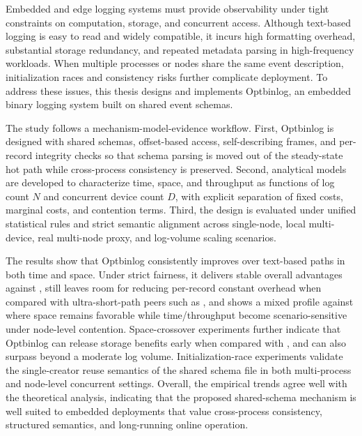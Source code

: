Embedded and edge logging systems must provide observability under tight constraints on computation, storage, and concurrent access. Although text-based logging is easy to read and widely compatible, it incurs high formatting overhead, substantial storage redundancy, and repeated metadata parsing in high-frequency workloads. When multiple processes or nodes share the same event description, initialization races and consistency risks further complicate deployment. To address these issues, this thesis designs and implements Optbinlog, an embedded binary logging system built on shared event schemas.

The study follows a mechanism-model-evidence workflow. First, Optbinlog is designed with shared schemas, offset-based access, self-describing frames, and per-record integrity checks so that schema parsing is moved out of the steady-state hot path while cross-process consistency is preserved. Second, analytical models are developed to characterize time, space, and throughput as functions of log count \(N\) and concurrent device count \(D\), with explicit separation of fixed costs, marginal costs, and contention terms. Third, the design is evaluated under unified statistical rules and strict semantic alignment across single-node, local multi-device, real multi-node proxy, and log-volume scaling scenarios.

The results show that Optbinlog consistently improves over text-based paths in both time and space. Under strict fairness, it delivers stable overall advantages against , still leaves room for reducing per-record constant overhead when compared with ultra-short-path peers such as , and shows a mixed profile against  where space remains favorable while time/throughput become scenario-sensitive under node-level contention. Space-crossover experiments further indicate that Optbinlog can release storage benefits early when compared with , and can also surpass  beyond a moderate log volume. Initialization-race experiments validate the single-creator reuse semantics of the shared schema file in both multi-process and node-level concurrent settings. Overall, the empirical trends agree well with the theoretical analysis, indicating that the proposed shared-schema mechanism is well suited to embedded deployments that value cross-process consistency, structured semantics, and long-running online operation.
